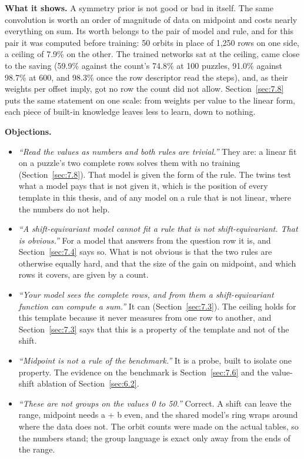\textbf{What it shows.} A symmetry prior is not good or bad in itself. The same convolution is worth an order of magnitude of data on midpoint and costs nearly everything on sum. Its worth belongs to the pair of model and rule, and for this pair it was computed before training: 50 orbits in place of 1,250 rows on one side, a ceiling of 7.9\% on the other. The trained networks sat at the ceiling, came close to the saving (59.9\% against the count's 74.8\% at 100 puzzles, 91.0\% against 98.7\% at 600, and 98.3\% once the row descriptor read the steps), and, as their weights per offset imply, got no row the count did not allow. Section~\ref{sec:7.8} puts the same statement on one scale: from weights per value to the linear form, each piece of built-in knowledge leaves less to learn, down to nothing.

\textbf{Objections.}

\begin{itemize}
\item \emph{``Read the values as numbers and both rules are trivial.''} They are: a linear fit on a puzzle's two complete rows solves them with no training (Section~\ref{sec:7.8}). That model is given the form of the rule. The twins test what a model pays that is not given it, which is the position of every template in this thesis, and of any model on a rule that is not linear, where the numbers do not help.
\item \emph{``A shift-equivariant model cannot fit a rule that is not shift-equivariant. That is obvious.''} For a model that answers from the question row it is, and Section~\ref{sec:7.4} says so. What is not obvious is that the two rules are otherwise equally hard, and that the size of the gain on midpoint, and which rows it covers, are given by a count.
\item \emph{``Your model sees the complete rows, and from them a shift-equivariant function can compute a sum.''} It can (Section~\ref{sec:7.3}). The ceiling holds for this template because it never measures from one row to another, and Section~\ref{sec:7.3} says that this is a property of the template and not of the shift.
\item \emph{``Midpoint is not a rule of the benchmark.''} It is a probe, built to isolate one property. The evidence on the benchmark is Section~\ref{sec:7.6} and the value-shift ablation of Section~\ref{sec:6.2}.
\item \emph{``These are not groups on the values 0 to 50.''} Correct. A shift can leave the range, midpoint needs a + b even, and the shared model's ring wraps around where the data does not. The orbit counts were made on the actual tables, so the numbers stand; the group language is exact only away from the ends of the range.
\end{itemize}


